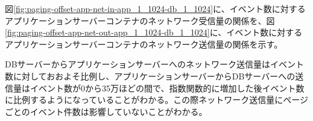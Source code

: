 \documentclass[../../../../main]{subfiles}
\begin{document}
    \label{subsubsubsec:result-paging-offset-only-limit-net-io}

    図\ref{fig:paging-offset-app-net-in-app_1_1024-db_1_1024}に、イベント数に対するアプリケーションサーバーコンテナのネットワーク受信量の関係を、図\ref{fig:paging-offset-app-net-out-app_1_1024-db_1_1024}に、イベント数に対するアプリケーションサーバーコンテナのネットワーク送信量の関係を示す。

    
    

    DBサーバーからアプリケーションサーバーへのネットワーク送信量はイベント数に対しておおよそ比例し、アプリケーションサーバーからDBサーバーへの送信量はイベント数が0から35万ほどの間で、指数関数的に増加した後イベント数に比例するようになっていることがわかる。この際ネットワーク送信量にページごとのイベント件数は影響していないことがわかる。
\end{document}
